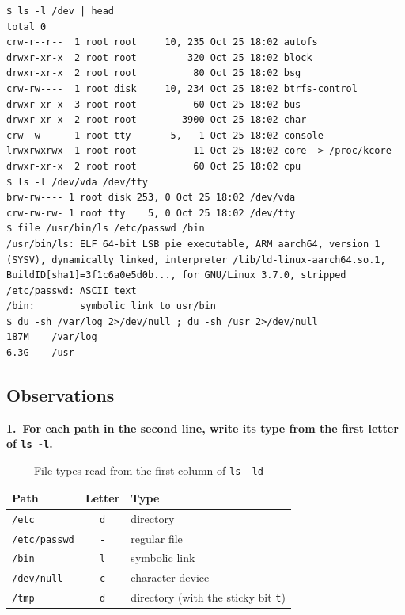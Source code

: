 \documentclass[12pt,a4paper]{article}
\newcommand{\qa}[2]{%
  \par\needspace{5\baselineskip}\medskip
  \noindent\textbf{#1.~#2}\par\smallskip\noindent}
\begin{document}
\begin{lstlisting}[style=terminal,caption={The first entries of /dev, the file command and the disk usage}]
$ ls -l /dev | head
total 0
crw-r--r--  1 root root     10, 235 Oct 25 18:02 autofs
drwxr-xr-x  2 root root         320 Oct 25 18:02 block
drwxr-xr-x  2 root root          80 Oct 25 18:02 bsg
crw-rw----  1 root disk     10, 234 Oct 25 18:02 btrfs-control
drwxr-xr-x  3 root root          60 Oct 25 18:02 bus
drwxr-xr-x  2 root root        3900 Oct 25 18:02 char
crw--w----  1 root tty       5,   1 Oct 25 18:02 console
lrwxrwxrwx  1 root root          11 Oct 25 18:02 core -> /proc/kcore
drwxr-xr-x  2 root root          60 Oct 25 18:02 cpu
$ ls -l /dev/vda /dev/tty
brw-rw---- 1 root disk 253, 0 Oct 25 18:02 /dev/vda
crw-rw-rw- 1 root tty    5, 0 Oct 25 18:02 /dev/tty
$ file /usr/bin/ls /etc/passwd /bin
/usr/bin/ls: ELF 64-bit LSB pie executable, ARM aarch64, version 1 (SYSV), dynamically linked, interpreter /lib/ld-linux-aarch64.so.1, BuildID[sha1]=3f1c6a0e5d0b..., for GNU/Linux 3.7.0, stripped
/etc/passwd: ASCII text
/bin:        symbolic link to usr/bin
$ du -sh /var/log 2>/dev/null ; du -sh /usr 2>/dev/null
187M    /var/log
6.3G    /usr
\end{lstlisting}

\subsection*{Observations}

\qa{1}{For each path in the second line, write its type from the first letter of \texttt{ls -l}.}

\begin{table}[H]
  \centering
  \caption{File types read from the first column of \texttt{ls -ld}}
  \begin{tabular}{lcl}
    \toprule
    \textbf{Path} & \textbf{Letter} & \textbf{Type} \\
    \midrule
    \texttt{/etc}        & \texttt{d} & directory \\
    \texttt{/etc/passwd} & \texttt{-} & regular file \\
    \texttt{/bin}        & \texttt{l} & symbolic link \\
    \texttt{/dev/null}   & \texttt{c} & character device \\
    \texttt{/tmp}        & \texttt{d} & directory (with the sticky bit \texttt{t}) \\
    \bottomrule
  \end{tabular}
\end{table}
\end{document}
